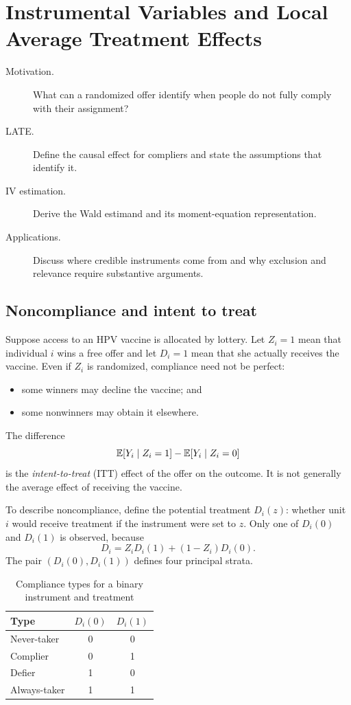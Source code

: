 \chapter{Instrumental Variables and Local Average Treatment Effects}
\label{chap:late}

\begin{description}
  \item[Motivation.] What can a randomized offer identify when people do not
  fully comply with their assignment?
  \item[LATE.] Define the causal effect for compliers and state the assumptions
  that identify it.
  \item[IV estimation.] Derive the Wald estimand and its moment-equation
  representation.
  \item[Applications.] Discuss where credible instruments come from and why
  exclusion and relevance require substantive arguments.
\end{description}

\section{Noncompliance and intent to treat}

Suppose access to an HPV vaccine is allocated by lottery.  Let $Z_i=1$ mean
that individual $i$ wins a free offer and let $D_i=1$ mean that she actually
receives the vaccine.  Even if $Z_i$ is randomized, compliance need not be
perfect:
\begin{itemize}
  \item some winners may decline the vaccine; and
  \item some nonwinners may obtain it elsewhere.
\end{itemize}
The difference
\[
  \mathbb{E}[Y_i\mid Z_i=1]-\mathbb{E}[Y_i\mid Z_i=0]
\]
is the \emph{intent-to-treat} (ITT) effect of the offer on the outcome.  It is
not generally the average effect of receiving the vaccine.

To describe noncompliance, define the potential treatment $D_i(z)$: whether
unit $i$ would receive treatment if the instrument were set to $z$.  Only one
of $D_i(0)$ and $D_i(1)$ is observed, because
\begin{equation}
  D_i=Z_iD_i(1)+(1-Z_i)D_i(0).
  \label{eq:late-observed-treatment}
\end{equation}
The pair $(D_i(0),D_i(1))$ defines four principal strata.

\begin{table}[tbp]
  \centering
  \caption{Compliance types for a binary instrument and treatment}
  \label{tab:late-types}
  \begin{tabular}{lcc}
    \toprule
    Type & $D_i(0)$ & $D_i(1)$\\
    \midrule
    Never-taker  & 0 & 0\\
    Complier     & 0 & 1\\
    Defier       & 1 & 0\\
    Always-taker & 1 & 1\\
    \bottomrule
  \end{tabular}
\end{table}

